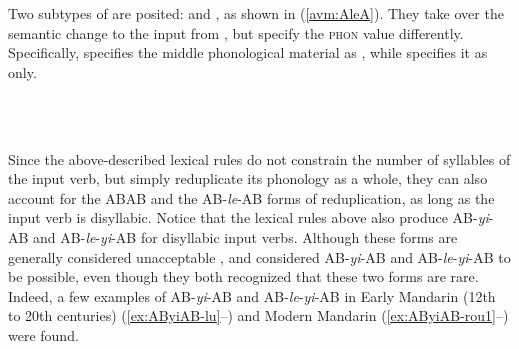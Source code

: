 Two subtypes of  are posited:
and , as shown in (\ref{avm:AleA}). %
They take over the semantic change to the input from , but specify the \textsc{phon} value differently.
Specifically,  specifies the middle phonological material as
, while  specifies it as  only.


\ea\label{avm:AleA}
\ea    %
         \impl\\
\ex   %
     \impl\\
\z
\z



Since the above-described lexical rules do not constrain the number of syllables of the input verb, but simply reduplicate its phonology  as a whole,
they can also account for the ABAB and the AB-\textit{le}-AB forms of reduplication,
as long as the input verb is disyllabic.
Notice that  the lexical rules above also produce AB-\textit{yi}-AB and AB\hyp{}\textit{le}\hyp{}\textit{yi}\hyp{}AB for disyllabic input verbs.
Although these forms are generally considered unacceptable \citetext{\citealp[30]{LiThompson1981}; \citealp[275--276]{Hong1999};  \citealp[160]{BascianoMelloni2017}; \citealp[239]{YangWei2017}}, 
\citet[269]{Fan1964} and \citet[143]{Sui2018} considered AB-\textit{yi}-AB and AB-\textit{le}-\textit{yi}-AB to be possible, even though they both recognized that these two forms are rare.
Indeed, a few examples of AB\hyp{}\emph{yi}\hyp{}AB and AB\hyp{}\emph{le}\hyp{}\emph{yi}\hyp{}AB in Early Mandarin (12th to 20th centuries) (\ref{ex:AByiAB-lu}--) and Modern Mandarin (\ref{ex:AByiAB-rou1}--) were found.


